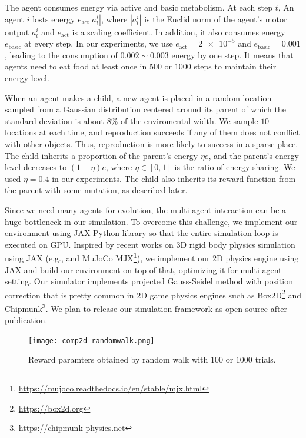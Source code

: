 The agent consumes energy via active and basic metabolism. At each step $t$, An agent $i$ losts energy $e_{\mathrm{act}} |a_{t}^{i}|$, where $|a_{t}^{i}|$ is the Euclid norm of the agent's motor output $a_{t}^{i}$ and $e_{\mathrm{act}}$ is a scaling coefficient. In addition, it also consumes energy $e_{\mathrm{basic}}$ at every step. In our experiments, we use $e_{\mathrm{act}} = \num{2e-5}$ and $e_{\mathrm{basic}} = 0.001$, leading to the consumption of $0.002 \sim 0.003$ energy by one step. It means that agents need to eat food at least once in $500$ or $1000$ steps to maintain their energy level.

When an agent makes a child, a new agent is placed in a random location sampled from a Gaussian distribution centered around its parent of which the standard deviation is about $8\%$ of the enviromental width. We sample $10$ locations at each time, and reproduction succeeds if any of them does not conflict with other objects. Thus, reproduction is more likely to success in a sparse place. The child inherits a proportion of the parent's energy $\eta e$, and the parent's energy level decreases to $(1-\eta)e$, where $\eta \in [0, 1]$ is the ratio of energy sharing. We used $\eta = 0.4$ in our experiments. The child also inherits its reward function from the parent with some mutation, as described later.

Since we need many agents for evolution, the multi-agent interaction can be a huge bottleneck in our simulation. To overcome this challenge, we implement our environment using JAX Python library \citep{jax2018github} so that the entire simulation loop is executed on GPU. Inspired by recent works on 3D rigid body physics simulation using JAX (e.g., \citet{brax2021github} and MuJoCo \citep{todorov2012mujoco} MJX\footnote{\url{https://mujoco.readthedocs.io/en/stable/mjx.html}}), we implement our 2D physics engine using JAX and build our environment on top of that, optimizing it for multi-agent setting. Our simulator implements projected Gauss-Seidel method with position correction \citep{catto2005iterative} that is pretty common in 2D game physics engines such as Box2D\footnote{\url{https://box2d.org}} and Chipmunk\footnote{\url{https://chipmunk-physics.net}}. We plan to release our simulation framework as open source after publication.

\begin{figure}[t]
  \centering
  \texttt{[image: comp2d-randomwalk.png]}
  \caption{Reward paramters obtained by random walk with $100$ or $1000$ trials.}\label{figure:rew-random}
\end{figure}

